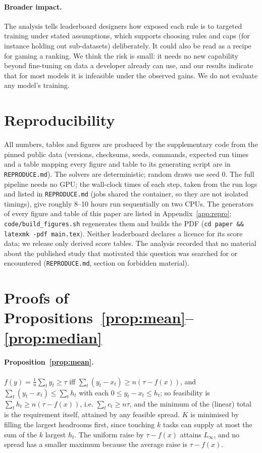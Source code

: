 \documentclass{article}
\begin{document}
\paragraph{Broader impact.}
The analysis tells leaderboard designers how exposed each rule is to targeted training under stated assumptions, which supports choosing rules and caps (for instance holding out sub-datasets) deliberately. It could also be read as a recipe for gaming a ranking. We think the risk is small: it needs no new capability beyond fine-tuning on data a developer already can use, and our results indicate that for most models it is infeasible under the observed gains. We do not evaluate any model's training.

\section{Reproducibility}
\label{sec:repro}
All numbers, tables and figures are produced by the supplementary code from the pinned public data (versions, checksums, seeds, commands, expected run times and a table mapping every figure and table to its generating script are in \texttt{REPRODUCE.md}). The solvers are deterministic; random draws use seed 0. The full pipeline needs no GPU; the wall-clock times of each step, taken from the run logs and listed in \texttt{REPRODUCE.md} (jobs shared the container, so they are not isolated timings), give roughly 8--10 hours run sequentially on two CPUs. The generators of every figure and table of this paper are listed in Appendix~\ref{app:repro}; \texttt{code/build\_figures.sh} regenerates them and builds the PDF (\texttt{cd paper \&\& latexmk -pdf main.tex}). Neither leaderboard declares a licence for its score data; we release only derived score tables. The analysis recorded that no material about the published study that motivated this question was searched for or encountered (\texttt{REPRODUCE.md}, section on forbidden material).





\appendix
\section{Proofs of Propositions~\ref{prop:mean}--\ref{prop:median}}
\label{app:proofs}
\paragraph{Proposition~\ref{prop:mean}.} $f(y)=\frac1n\sum_t y_t\ge\tau$ iff $\sum_t(y_t-x_t)\ge n(\tau-f(x))$, and $\sum_t(y_t-x_t)\le\sum_t h_t$ with each $0\le y_t-x_t\le h_t$; so feasibility is $\sum_t h_t\ge n(\tau-f(x))$, i.e. $\sum_t c_t\ge n\tau$, and the minimum of the (linear) total is the requirement itself, attained by any feasible spread. $K$ is minimised by filling the largest headrooms first, since touching $k$ tasks can supply at most the sum of the $k$ largest $h_t$. The uniform raise by $\tau-f(x)$ attains $L_\infty$, and no spread has a smaller maximum because the average raise is $\tau-f(x)$.
\end{document}

